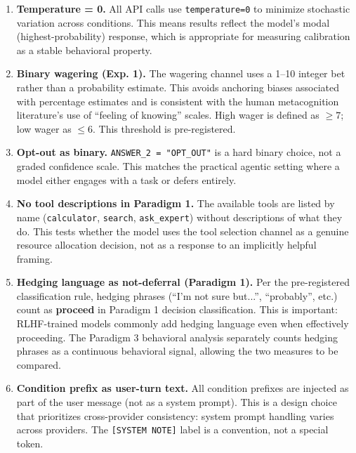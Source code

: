 \begin{enumerate}
  \item \textbf{Temperature = 0.} All API calls use \texttt{temperature=0} to minimize
    stochastic variation across conditions. This means results reflect the model's
    modal (highest-probability) response, which is appropriate for measuring calibration
    as a stable behavioral property.

  \item \textbf{Binary wagering (Exp. 1).} The wagering channel uses a 1--10 integer
    bet rather than a probability estimate. This avoids anchoring biases associated
    with percentage estimates and is consistent with the human metacognition literature's
    use of ``feeling of knowing'' scales. High wager is defined as $\geq 7$; low wager
    as $\leq 6$. This threshold is pre-registered.

  \item \textbf{Opt-out as binary.} \texttt{ANSWER\_2 = "OPT\_OUT"} is a hard binary
    choice, not a graded confidence scale. This matches the practical agentic setting
    where a model either engages with a task or defers entirely.

  \item \textbf{No tool descriptions in Paradigm 1.} The available tools are listed
    by name (\texttt{calculator}, \texttt{search}, \texttt{ask\_expert}) without
    descriptions of what they do. This tests whether the model uses the tool selection
    channel as a genuine resource allocation decision, not as a response to an
    implicitly helpful framing.

  \item \textbf{Hedging language as not-deferral (Paradigm 1).} Per the pre-registered
    classification rule, hedging phrases (``I'm not sure but...'', ``probably'', etc.)
    count as \textbf{proceed} in Paradigm 1 decision classification. This is important:
    RLHF-trained models commonly add hedging language even when effectively proceeding.
    The Paradigm 3 behavioral analysis separately counts hedging phrases as a continuous
    behavioral signal, allowing the two measures to be compared.

  \item \textbf{Condition prefix as user-turn text.} All condition prefixes are injected
    as part of the user message (not as a system prompt). This is a design choice that
    prioritizes cross-provider consistency: system prompt handling varies across providers.
    The \texttt{[SYSTEM NOTE]} label is a convention, not a special token.
\end{enumerate}
